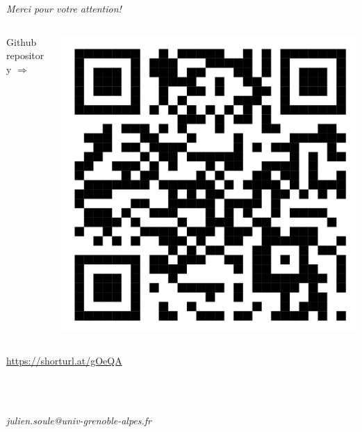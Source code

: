

\section*{\phantom{Thanks}}

\begin{frame}{}

  \vspace{6ex}

  \centering
  {
    \Huge
    \emph{Merci pour votre attention!}
  }

  \vspace{6ex}

  \begin{columns}

    \hspace{-27ex}

    \begin{column}{0.5\textwidth}
      \raggedleft
      {\Large Github repository $\Longrightarrow$}
    \end{column}

    \hspace{-12ex}

    \begin{column}{0.5\textwidth}
      \includegraphics[width=0.5\linewidth]{figures/demo_qr_code.png}
    \end{column}

  \end{columns}

  \vspace{3ex}

  \centering
  {\Large
    \url{https://shorturl.at/gOeQA}
  }

  \ \\
  
  \

  \textit{julien.soule@univ-grenoble-alpes.fr}

\end{frame}
